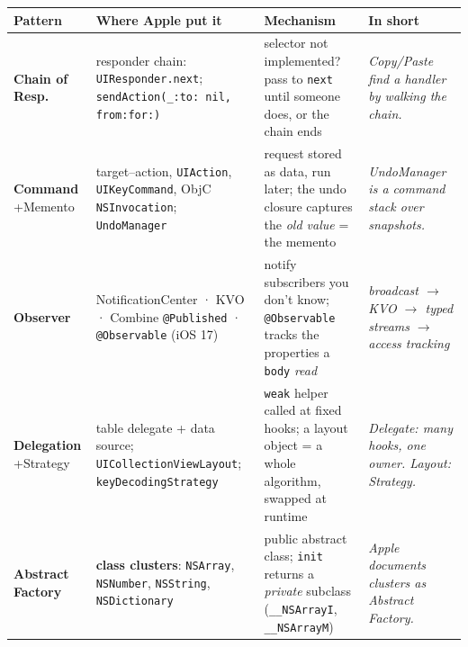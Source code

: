 \documentclass[8pt]{extarticle}
\newcommand\say[1]{\textcolor{sheetBlue}{\emph{#1}}}
\begin{document}



\vspace{2pt}
{\footnotesize\setlength\tabcolsep{3pt}\renewcommand{\arraystretch}{1.0}
\noindent\begin{tabularx}{\linewidth}{@{}L{16mm}L{50mm}L{53mm}X@{}}
\toprule
\textbf{Pattern} & \textbf{Where Apple put it} & \textbf{Mechanism} & \textbf{In short} \\
\midrule
\textbf{Chain of Resp.} & responder chain: \texttt{UIResponder.next};
\texttt{sendAction(\_:to: nil, from:for:)} & selector not implemented? pass to \texttt{next}
until someone does, or the chain ends & \say{Copy/Paste find a handler by walking the chain.} \\
\textbf{Command} +Memento & target–action, \texttt{UIAction}, \texttt{UIKeyCommand}, ObjC
\texttt{NSInvocation}; \texttt{UndoManager} & request stored as data, run later; the undo closure
captures the \emph{old value} = the memento & \say{UndoManager is a command stack over
snapshots.} \\
\textbf{Observer} & NotificationCenter · KVO · Combine \texttt{@Published} · \texttt{@Observable}
(iOS 17) & notify subscribers you don't know; \texttt{@Observable} tracks the properties a
\texttt{body} \emph{read} & \say{broadcast $\to$ KVO $\to$ typed streams $\to$ access tracking} \\
\textbf{Delegation} +Strategy & table delegate + data source; \texttt{UICollectionViewLayout};
\texttt{keyDecodingStrategy} &
\texttt{weak} helper called at fixed hooks; a layout object = a whole algorithm, swapped at
runtime & \say{Delegate: many hooks, one owner. Layout: Strategy.} \\
\textbf{Abstract Factory} & \textbf{class clusters}: \texttt{NSArray}, \texttt{NSNumber},
\texttt{NSString}, \texttt{NSDictionary} & public abstract class; \texttt{init} returns a
\emph{private} subclass (\texttt{\_\_NSArrayI}, \texttt{\_\_NSArrayM}) & \say{Apple documents
clusters as Abstract Factory.} \\

\end{tabularx}}
\end{document}
